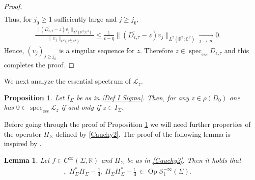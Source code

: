 \documentclass[11pt,a4paper,reqno,oneside]{amsproc}
\DeclareMathOperator{\spec}{spec}
\DeclareMathOperator{\Op}{Op}
\newcommand{\spece}{\spec_\mathrm{ess}}
\newcommand{\cS}{\mathcal{S}}
\def \rr {{\mathbb R}}
\def \cc {{\mathbb C}}
\numberwithin{equation}{section}
\def \cc {{\mathbb{C}}}
\newtheorem{proposition}[definition]{Proposition}
\newtheorem{lemma}[definition]{Lemma}
\begin{document}
\begin{proof}
\begin{align*}
\end{align*}
Thus, for $j_0\geq 1$ sufficiently large and $j\geq j_0$,
\begin{align*}
\frac{\| ( \overline{D_{\epsilon,\tau}}- z)v_j\|_{L^2(\rr^2;\cc^2)}}{\| v_j\|_{L^2(\rr^2;\cc^2)} }\leq \frac{1}{c-\eta} \| ( \overline{D_{\epsilon,\tau}}- z)v_j\|_{L^2(\rr^2;\cc^2)} \xrightarrow[j\to\infty]{} 0.
\end{align*}
Hence, $(v_j)_{j\geq j_0}$ is a singular sequence for $z$. Therefore $z\in\spece  \overline{D_{\epsilon,\tau}}$ and this completes the proof.
\end{proof}

We next analyze the essential spectrum of $\mathcal L_z$.
\begin{proposition}\label{Spec ess L} Let $I_\Sigma$ be as in \eqref{Def I Sigma}. Then, for any  $z\in  \rho(D_0)$  one has $0\in \spece \mathcal L_z$ if and only if $z\in I_\Sigma$.
\end{proposition}
Before going through the proof of Proposition \ref{Spec ess L} we will need further properties of the operator $H_\Sigma$ defined by \eqref{Cauchy2}. The proof of the following lemma is inspired by \cite[Sec. 5]{bell}.
\begin{lemma}\label{Cummutator smooth} Let $f\in C^\infty(\Sigma,\rr)$ and $H_\Sigma$ be as in \eqref{Cauchy2}.  Then it  holds that 
\begin{align*}
[H_\Sigma,f],\,\,H_\Sigma^\ast H_\Sigma-\frac{1}{4},\, H_\Sigma H^\ast_\Sigma-\frac{1}{4}\,\in  \Op \cS^{-\infty}_1(\Sigma).
\end{align*}
\end{lemma}	
\end{document}
